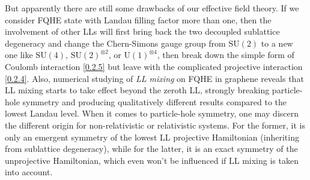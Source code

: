 \documentclass[bachelor,english,numbers]{ustcthesis}
\begin{document}
		But apparently there are still some drawbacks of our effective field theory. If we consider FQHE state with Landau filling factor more than one, then the involvement of other LLs will first bring back the two decoupled sublattice degeneracy and change the Chern-Simons gauge group from $\mathrm{SU}(2)$ to a new one like $\mathrm{SU}(4)$, $\mathrm{SU}(2)^{\otimes 2}$, or $\mathrm{U}(1)^{\otimes4}$, then break down the simple form of Coulomb interaction \eqref{0.2.5} but leave with the complicated projective interaction \eqref{0.2.4}. Also, numerical studying of \emph{LL mixing} on FQHE in graphene \cite{peterson2014effects,peterson2013more} reveals that LL mixing starts to take effect beyond the zeroth LL, strongly breaking particle-hole symmetry and producing qualitatively different results compared to the lowest Landau level. When it comes to particle-hole symmetry, one may discern the different origin for non-relativistic or relativistic systems. For the former, it is only an emergent symmetry of the lowest LL projective Hamiltonian (inheriting from sublattice degeneracy), while for the latter, it is an exact symmetry of the unprojective Hamiltonian, which even won't be influenced if LL mixing is taken into account.\par
\end{document}
